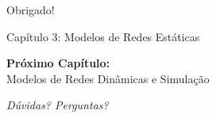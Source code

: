 \begin{frame}
\begin{center}
{\Huge Obrigado!}

\vspace{1cm}

{\Large Capítulo 3: Modelos de Redes Estáticas}

\vspace{1cm}

\textbf{Próximo Capítulo:}\\
Modelos de Redes Dinâmicas e Simulação

\vspace{1cm}

\textit{Dúvidas? Perguntas?}
\end{center}
\end{frame}


